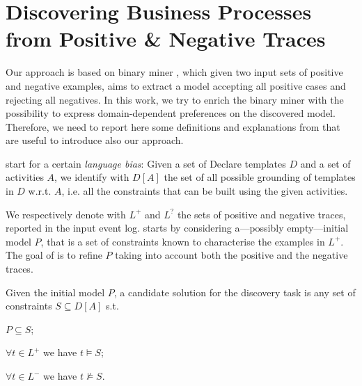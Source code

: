 
\section{Discovering Business Processes from Positive \& Negative Traces}
\label{sec:deviant}



Our approach is based on \nd binary miner \cite{deviant-tkde}, which given two input sets of positive and negative examples, aims to extract a model accepting all positive cases and rejecting all negatives. 
In this work, we try to enrich the binary miner with the possibility to express domain-dependent preferences on the discovered model. Therefore, we need to report here some definitions and explanations from \cite{deviant-tkde} that are useful to introduce also our approach.

\nd start for a certain \emph{language bias}: Given a set of Declare templates $D$ and a set of activities $A$, we identify with $D[A]$ the set of all possible grounding of templates in $D$ w.r.t. $A$, i.e. all the constraints that can be built using the given activities.

We respectively denote with $L^+$ and $L^?$ the sets of positive and negative traces, reported in the input event log. \nd starts by considering a---possibly empty---initial model $P$, that is a set of \declare constraints known to characterise the examples in $L^+$. The goal of \nd is to refine $P$ taking into account both the positive and the negative traces.

\begin{definition}{}\label{def:cand}
Given the initial model $P$, a candidate solution for the discovery task is any set of constraints $S\subseteq D[A]$ s.t.
\begin{enumerate*} [label=\textit{(\roman*)}]
  \item $P\subseteq S$;
  \item $\forall t\in L^+$ we have $t\models S$;
  \item $\forall t\in L^-$ we have $t\not\models S$.
\end{enumerate*}
\end{definition}

